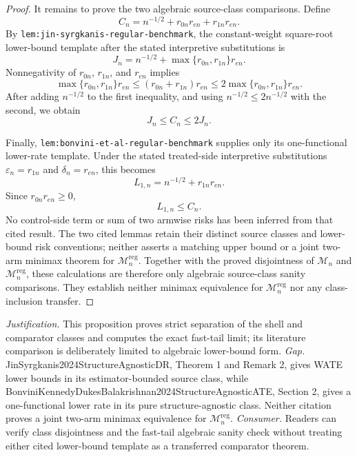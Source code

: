 \documentclass{article}
\begin{document}
\begin{proof}
It remains to prove the two algebraic source-class comparisons.  Define
\[
C_n=n^{-1/2}+r_{0n}r_{en}+r_{1n}r_{en}.
\]
By \texttt{lem:jin-syrgkanis-regular-benchmark}, the constant-weight
square-root lower-bound template after the stated interpretive substitutions is
\[
J_n=n^{-1/2}+\max\{r_{0n},r_{1n}\}r_{en}.
\]
Nonnegativity of \(r_{0n}\), \(r_{1n}\), and \(r_{en}\) implies
\[
\max\{r_{0n},r_{1n}\}r_{en}
\le (r_{0n}+r_{1n})r_{en}
\le 2\max\{r_{0n},r_{1n}\}r_{en}.
\]
After adding \(n^{-1/2}\) to the first inequality, and using
\(n^{-1/2}\le2n^{-1/2}\) with the second, we obtain
\[
J_n\le C_n\le2J_n.
\]

Finally, \texttt{lem:bonvini-et-al-regular-benchmark} supplies only its
one-functional lower-rate template.  Under the stated treated-side
interpretive substitutions \(\varepsilon_n=r_{1n}\) and
\(\delta_n=r_{en}\), this becomes
\[
L_{1,n}=n^{-1/2}+r_{1n}r_{en}.
\]
Since \(r_{0n}r_{en}\ge0\),
\[
L_{1,n}\le C_n.
\]
No control-side term or sum of two armwise risks has been inferred from that
cited result.  The two cited lemmas retain their distinct source classes and
lower-bound risk conventions; neither asserts a matching upper bound or a joint
two-arm minimax theorem for \(\mathcal M_n^{\mathrm{reg}}\).  Together with the
proved disjointness of \(\mathcal M_n\) and
\(\mathcal M_n^{\mathrm{reg}}\), these calculations are therefore only
algebraic source-class sanity comparisons.  They establish neither minimax
equivalence for \(\mathcal M_n^{\mathrm{reg}}\) nor any class-inclusion
transfer.
\end{proof}
\par\smallskip\noindent \textit{Justification.} This proposition proves strict separation of the shell and comparator classes and computes the exact fast-tail limit; its literature comparison is deliberately limited to algebraic lower-bound form. \textit{Gap.} JinSyrgkanis2024StructureAgnosticDR, Theorem 1 and Remark 2, gives WATE lower bounds in its estimator-bounded source class, while BonviniKennedyDukesBalakrishnan2024StructureAgnosticATE, Section 2, gives a one-functional lower rate in its pure structure-agnostic class. Neither citation proves a joint two-arm minimax equivalence for \(\mathcal M_n^{\mathrm{reg}}\). \textit{Consumer.} Readers can verify class disjointness and the fast-tail algebraic sanity check without treating either cited lower-bound template as a transferred comparator theorem.
\end{document}
